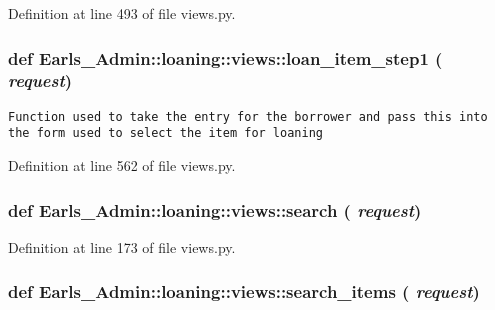 Definition at line 493 of file views.py.\hypertarget{namespaceEarls__Admin_1_1loaning_1_1views_6d3c5974ea74407eb68ad7685e51c863}{
\subsubsection[loan\_\-item\_\-step1]{\setlength{\rightskip}{0pt plus 5cm}def Earls\_\-Admin::loaning::views::loan\_\-item\_\-step1 ( {\em request})}}
\label{namespaceEarls__Admin_1_1loaning_1_1views_6d3c5974ea74407eb68ad7685e51c863}




\footnotesize\begin{verbatim}Function used to take the entry for the borrower and pass this into the form used to select the item for loaning\end{verbatim}
\normalsize
 

Definition at line 562 of file views.py.\hypertarget{namespaceEarls__Admin_1_1loaning_1_1views_3446daee6cabaea8299b2d2d53c15d4f}{
\subsubsection[search]{\setlength{\rightskip}{0pt plus 5cm}def Earls\_\-Admin::loaning::views::search ( {\em request})}}
\label{namespaceEarls__Admin_1_1loaning_1_1views_3446daee6cabaea8299b2d2d53c15d4f}




Definition at line 173 of file views.py.\hypertarget{namespaceEarls__Admin_1_1loaning_1_1views_09922582780aec8f77bdc2842eef676b}{
\subsubsection[search\_\-items]{\setlength{\rightskip}{0pt plus 5cm}def Earls\_\-Admin::loaning::views::search\_\-items ( {\em request})}}
\label{namespaceEarls__Admin_1_1loaning_1_1views_09922582780aec8f77bdc2842eef676b}




